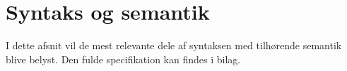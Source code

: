 \section{Syntaks og semantik}\label{sec:Syntax}
I dette afsnit vil de mest relevante dele af syntaksen med tilhørende semantik blive belyst. Den fulde specifikation kan findes i bilag. 



